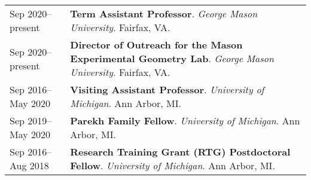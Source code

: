 
    \medskip


    \medskip
    
    \begin{center}
    {
    \renewcommand{\arraystretch}{1.5}
    \begin{longtable}{p{}  p{}}
    Sep 2020--present & \textbf{Term Assistant Professor}. \textit{George Mason University}.  Fairfax, VA.  \\ 
Sep 2020--present & \textbf{Director of Outreach for the Mason Experimental Geometry Lab}. \textit{George Mason University}.  Fairfax, VA.  \\ 
Sep 2016--May 2020 & \textbf{Visiting Assistant Professor}. \textit{University of Michigan}.  Ann Arbor, MI.  \\ 
Sep 2019--May 2020 & \textbf{Parekh Family Fellow}. \textit{University of Michigan}.  Ann Arbor, MI.  \\ 
Sep 2016--Aug 2018 & \textbf{Research Training Grant (RTG) Postdoctoral Fellow}. \textit{University of Michigan}.  Ann Arbor, MI.  
    \end{longtable}
    } 
    \end{center}

    \vspace{-1em}
    